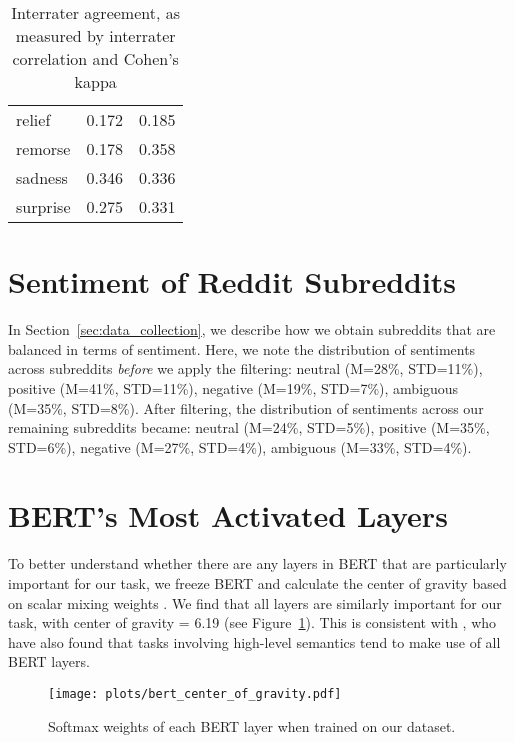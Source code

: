 \documentclass[11pt,a4paper]{article}
\begin{document}
\begin{table}[h!]
{\begin{centering}
\begin{tabular}{@{}lcc@{}}
relief           & 0.172                                                                     & 0.185                                                            \\
remorse          & 0.178                                                                     & 0.358                                                            \\
sadness          & 0.346                                                                     & 0.336                                                            \\
surprise         & 0.275                                                                     & 0.331                                                            \\ \bottomrule
\end{tabular}
    \end{centering}
    }
    \caption{Interrater agreement, as measured by interrater correlation and Cohen's kappa}
    \label{tab:emo_agreements}
\end{table}

\section{Sentiment of Reddit Subreddits}
In Section~\ref{sec:data_collection}, we describe how we obtain subreddits that are balanced in terms of sentiment. Here, we note the distribution of sentiments across subreddits \emph{before} we apply the filtering: neutral (M=28\%, STD=11\%), positive (M=41\%, STD=11\%), negative (M=19\%, STD=7\%), ambiguous (M=35\%, STD=8\%). After filtering, the distribution of sentiments across our remaining subreddits became: neutral (M=24\%, STD=5\%), positive (M=35\%, STD=6\%), negative (M=27\%, STD=4\%), ambiguous (M=33\%, STD=4\%).




\section{BERT's Most Activated Layers}

To better understand whether there are any layers in BERT that are particularly important for our task, we freeze BERT and calculate the center of gravity \citep{tenney2019bert} based on scalar mixing weights \citep{peters2018deep}. We find that all layers are similarly important for our task, with center of gravity = 6.19 (see Figure~\ref{fig:bert_gravity}). This is consistent with \citet{tenney2019bert}, who have also found that tasks involving high-level semantics tend to make use of all BERT layers.
\begin{figure}[h]
 \centering
   \centering
   \texttt{[image: plots/bert\_center\_of\_gravity.pdf]}
   \caption{Softmax weights of each BERT layer when trained on our dataset.}
   \label{fig:bert_gravity}
\end{figure}
\end{document}
